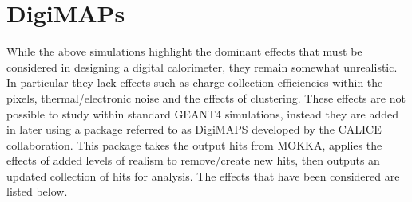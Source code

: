 \section{DigiMAPs}

While the above simulations highlight the dominant effects that must be considered in designing a digital calorimeter, they remain somewhat unrealistic. In particular they lack effects such as charge collection efficiencies within the pixels, thermal/electronic noise and the effects of clustering. These effects are not possible to study within standard GEANT4 simulations, instead they are added in later using a package referred to as DigiMAPS developed by the \ac{CALICE} collaboration. This package takes the output hits from MOKKA, applies the effects of added levels of realism to remove/create new hits, then outputs an updated collection of hits for analysis. The effects that have been considered are listed below.

